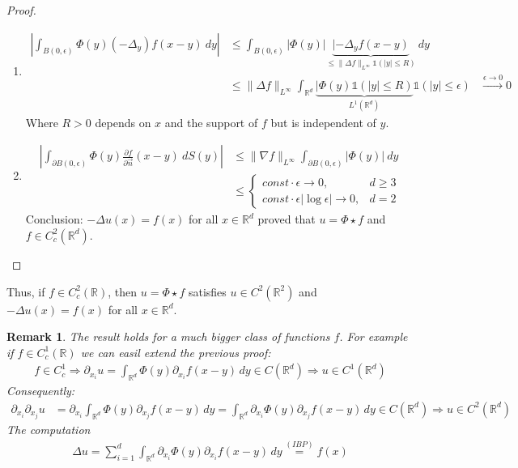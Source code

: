 \documentclass{report}
\theoremstyle{tommy}
\newtheorem{rem}[defn]{Remark}
\begin{document}
\begin{proof}
      \begin{enumerate}
        \item 
          \begin{align*}
            \left| \int_{B(0, \epsilon)} \Phi(y) (- \Delta_y) f(x-y) \ dy\right| 
            &\le \int_{B(0, \epsilon)}|\Phi(y)| \underbrace{|-\Delta_y f(x-y)}_{\le \|\Delta f\|_{L^\infty} \mathbb{1}(|y| \le R)} \ dy \\
            &\le \| \Delta f\|_{L^\infty} \int_{\mathbb{R}^d} \underbrace{|\Phi(y) \mathbb{1}(|y| \le R)}_{L^1(\mathbb{R}^d)} \mathbb{1}(|y| \le \epsilon) 
            &\xrightarrow{\epsilon \to 0} 0
          \end{align*}
        Where \(R > 0\) depends on \(x\) and the support of \(f\) but is independent of \(y\).
      \item 
        \begin{align*}
          \left|\int_{\partial B(0, \epsilon)} \Phi(y) \frac{\partial f}{\partial \vec{n}}(x-y) \ dS(y)\right|
          &\le \|\nabla f\|_{L^\infty} \int_{\partial B(0, \epsilon)} |\Phi(y)| \ dy \\
          &\le \begin{cases}
            const \cdot \epsilon \to 0, & d \ge 3 \\
            const \cdot \epsilon | \log \epsilon| \to 0, & d = 2
          \end{cases}
        \end{align*}
        Conclusion: \(-\Delta u(x) = f(x)\) for all \(x \in \mathbb{R}^d\) proved that \(u = \Phi \star f\) and \(f \in C_c^2(\mathbb{R}^d)\). \qedhere
      \end{enumerate}
  \end{proof}

  Thus, if \(f \in C_c^2(\mathbb{R})\), then \(u = \Phi \star f\) satisfies \(u \in C^2(\mathbb{R}^2)\) and \(-\Delta u(x) = f(x)\) for all \(x \in \mathbb{R}^d\).


\begin{rem}
  The result holds for a much bigger class of functions \(f\). For example if \(f \in C_c^1(\mathbb{R})\) we can easil extend the previous proof:
  \begin{align*}
    f \in C_c^1 \Rightarrow \partial_{x_i} u = \int_{\mathbb{R}^d} \Phi(y) \partial_{x_i} f(x-y) \, dy \in C(\mathbb{R}^d) \Rightarrow u \in C^1(\mathbb{R}^d)
  \end{align*}
  Consequently: 
  \begin{align*}
    \partial_{x_i} \partial_{x_j} u 
    &= \partial_{x_i} \int_{\mathbb{R}^d} \Phi(y) \partial_{x_j} f(x-y) \, dy
    = \int_{\mathbb{R}^d} \partial_{x_i} \Phi(y) \partial_{x_j} f(x-y) \, dy \in C(\mathbb{R}^d) \Rightarrow u \in C^2(\mathbb{R}^d)
  \end{align*}
  The computation
  \begin{align*}
    \Delta u = \sum_{i=1}^d \int_{\mathbb{R}^d} \partial_{x_i} \Phi(y) \partial_{x_i} f(x-y) \, dy \overset{(IBP)}{=} f(x)
  \end{align*}
\end{rem}
\end{document}
